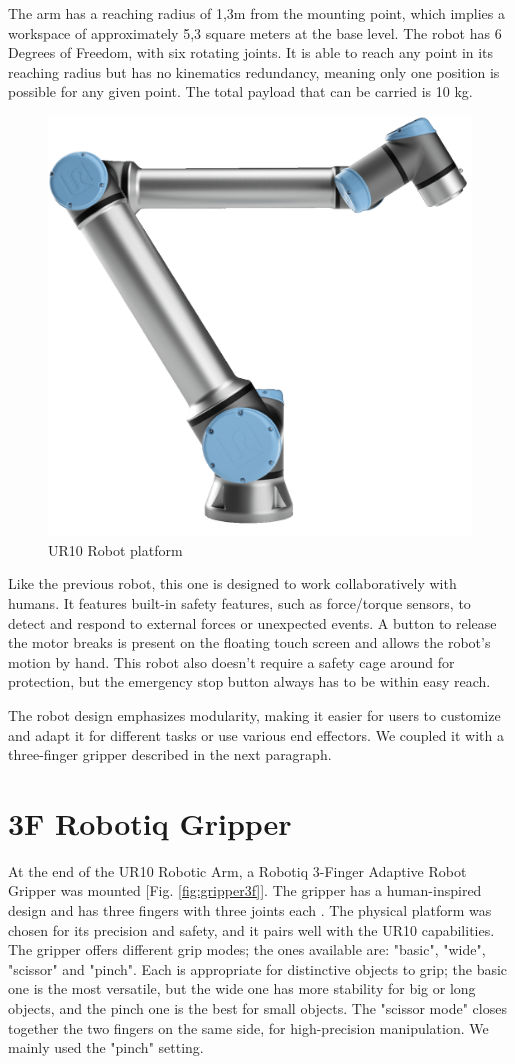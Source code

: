 The arm has a reaching radius of 1,3m from the mounting point, which implies a workspace of approximately 5,3 square meters at the base level. The robot has 6 Degrees of Freedom, with six rotating joints. It is able to reach any point in its reaching radius but has no kinematics redundancy, meaning only one position is possible for any given point. The total payload that can be carried is 10 kg. 

\begin{figure}
	\centering
	\includegraphics[width=0.5\linewidth]{Images/ur10.png}
	\caption{UR10 Robot platform}
	\label{fig:ur10}
\end{figure}

Like the previous robot, this one is designed to work collaboratively with humans. It features built-in safety features, such as force/torque sensors, to detect and respond to external forces or unexpected events. A button to release the motor breaks is present on the floating touch screen and allows the robot's motion by hand. This robot also doesn't require a safety cage around for protection, but the emergency stop button always has to be within easy reach. 

The robot design emphasizes modularity, making it easier for users to customize and adapt it for different tasks or use various end effectors. We coupled it with a three-finger gripper described in the next paragraph.


\section{3F Robotiq Gripper}
At the end of the UR10 Robotic Arm, a Robotiq 3-Finger Adaptive Robot Gripper was mounted [Fig. \ref{fig:gripper3f}]. The gripper has a human-inspired design and has three fingers with three joints each \cite{url:3fgripper}. The physical platform was chosen for its precision and safety, and it pairs well with the UR10 capabilities. The gripper offers different grip modes; the ones available are: "basic", "wide", "scissor" and "pinch". Each is appropriate for distinctive objects to grip; the basic one is the most versatile, but the wide one has more stability for big or long objects, and the pinch one is the best for small objects. The "scissor mode" closes together the two fingers on the same side, for high-precision manipulation. We mainly used the "pinch" setting. 

